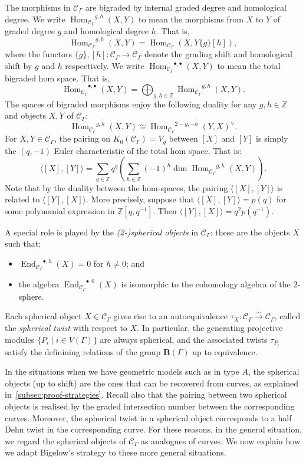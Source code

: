 \documentclass[a4paper]{amsart}
\newcommand{\0}{\mathbf{0}}
\DeclareMathOperator{\Hom}{Hom}
\DeclareMathOperator{\End}{End}
\newcommand{\HOM}{\ensuremath{\Hom_{\mathcal{C}_\Gamma}}}
\newcommand{\END}{\ensuremath{\End_{\mathcal{C}_{\Gamma}}}}
\theoremstyle{theorem}
\begin{document}
The morphisms in \(\mathcal{C}_{\Gamma}\) are bigraded by internal graded degree and homological degree.
We write \(\HOM^{g,h}(X,Y)\) to mean the morphisms from \(X\) to \(Y\) of graded degree \(g\) and homological degree \(h\).
That is,
\[\HOM^{g,h}(X,Y) = \HOM(X,Y\{g\}[h]),\]
where the functors \(\{g\}, [h] \colon \mathcal{C}_{\Gamma} \to \mathcal{C}_{\Gamma}\) denote the grading shift and homological shift by \(g\) and \(h\) respectively.
We write \(\HOM^{\bullet,\bullet}(X,Y)\) to mean the total bigraded hom space.
That is,
\[\HOM^{\bullet,\bullet}(X,Y) = \bigoplus_{g,h \in \mathbb{Z}}\HOM^{g,h}(X,Y).\]
The spaces of bigraded morphisms enjoy the following duality for any \(g, h \in \mathbb{Z}\) and objects \(X, Y\) of \(\mathcal{C}_{\Gamma}\):
\[\HOM^{g,h}(X,Y) \cong \HOM^{2-g, -h}(Y,X)^{\vee}.\]
For \(X,Y \in \mathcal{C}_{\Gamma}\), the pairing on $K_0(\mathcal{C}_\Gamma) = V_q$ between \([X]\) and \([Y]\) is simply the \((q,-1)\) Euler characteristic of the total hom space.
That is:
\[\langle [X], [Y] \rangle = \sum_{g \in \mathbb{Z}}q^g \left(\sum_{h \in \mathbb{Z}}(-1)^h \dim \HOM^{g,h}(X,Y)\right).\]
Note that by the duality between the hom-spaces, the pairing \(\langle [X],[Y] \rangle\) is related to \(\langle [Y], [X] \rangle\).
More precisely, suppose that \(\langle [X],[Y] \rangle = p(q)\) for some polynomial expression in \(\mathbb{Z}[q,q^{-1}]\).
Then 
\(\langle [Y], [X] \rangle = q^2 p(q^{-1})\).

A special role is played by the \emph{(2-)spherical objects} in \(\mathcal{C}_{\Gamma}\): these are the objects \(X\) such that:
\begin{itemize}
\item \(\END^{\bullet,h}(X) = 0\) for \(h \neq 0\); and
\item the algebra \(\END^{\bullet, 0}(X)\) is isomorphic to the cohomology algebra of the \(2\)-sphere.
\end{itemize}
Each spherical object \(X \in \mathcal{C}_{\Gamma}\) gives rise to an autoequivalence \(\tau_X \colon \mathcal{C}_{\Gamma} \xrightarrow{\sim} \mathcal{C}_{\Gamma}\), called the \emph{spherical twist} with respect to \(X\).
In particular, the generating projective modules \(\{P_i \mid i \in V(\Gamma)\}\) are always spherical, and the associated twists \(\tau_{P_i}\) satisfy the definining relations of the group \(\mathbf{B}(\Gamma)\) up to equivalence.


In the situations when we have geometric models such as in type \(A\), the spherical objects (up to shift) are the ones that can be recovered from curves, as explained in~\cref{subsec:proof-strategies}.
Recall also that the pairing between two spherical objects is realised by the graded intersection number between the corresponding curves.
Moreover, the spherical twist in a spherical object corresponds to a half Dehn twist in the corresponding curve.
For these reasons, in the general situation, we regard the spherical objects of \(\mathcal{C}_{\Gamma}\) as analogues of curves.
We now explain how we adapt Bigelow's strategy to these more general situations.
\end{document}

